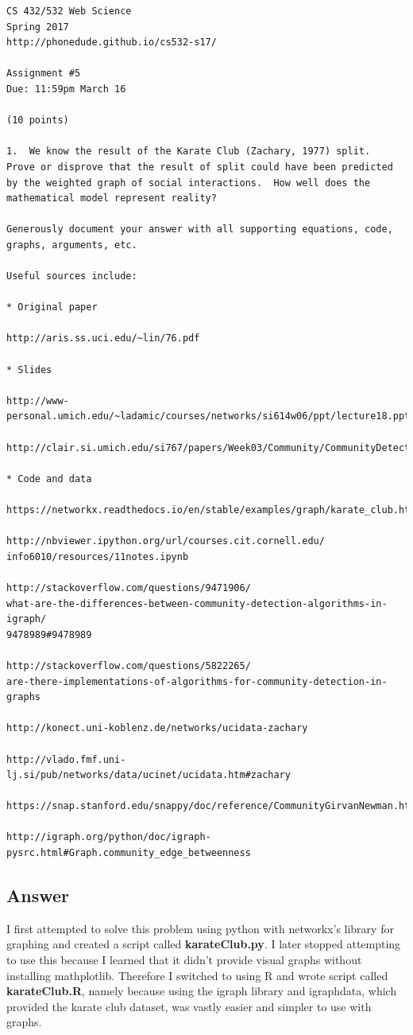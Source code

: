 \documentclass[letterpaper,11pt]{article}
\begin{document}
\begin{verbatim}
CS 432/532 Web Science
Spring 2017
http://phonedude.github.io/cs532-s17/

Assignment #5
Due: 11:59pm March 16

(10 points)

1.  We know the result of the Karate Club (Zachary, 1977) split.
Prove or disprove that the result of split could have been predicted
by the weighted graph of social interactions.  How well does the
mathematical model represent reality?

Generously document your answer with all supporting equations, code,
graphs, arguments, etc.

Useful sources include:

* Original paper

http://aris.ss.uci.edu/~lin/76.pdf

* Slides

http://www-personal.umich.edu/~ladamic/courses/networks/si614w06/ppt/lecture18.ppt

http://clair.si.umich.edu/si767/papers/Week03/Community/CommunityDetection.pptx

* Code and data

https://networkx.readthedocs.io/en/stable/examples/graph/karate_club.html

http://nbviewer.ipython.org/url/courses.cit.cornell.edu/
info6010/resources/11notes.ipynb

http://stackoverflow.com/questions/9471906/
what-are-the-differences-between-community-detection-algorithms-in-igraph/
9478989#9478989

http://stackoverflow.com/questions/5822265/
are-there-implementations-of-algorithms-for-community-detection-in-graphs

http://konect.uni-koblenz.de/networks/ucidata-zachary

http://vlado.fmf.uni-lj.si/pub/networks/data/ucinet/ucidata.htm#zachary

https://snap.stanford.edu/snappy/doc/reference/CommunityGirvanNewman.html

http://igraph.org/python/doc/igraph-pysrc.html#Graph.community_edge_betweenness
\end{verbatim}

\clearpage
\subsection*{Answer}

I first attempted to solve this problem using python with networkx's library for graphing and created a script called \textbf{karateClub.py}. I later stopped attempting to use this because I learned that it didn't provide visual graphs without installing mathplotlib. Therefore I switched to using R and wrote script called \textbf{karateClub.R}, namely because using the igraph library and igraphdata, which provided the karate club dataset, was vastly easier and simpler to use with graphs.
\end{document}
